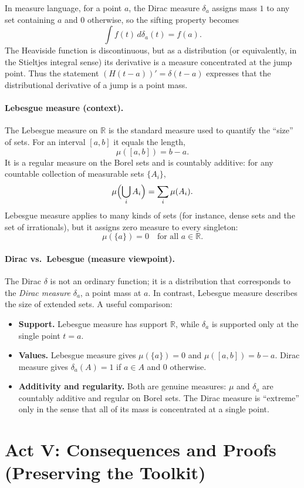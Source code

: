 \documentclass[12pt]{article}
\begin{document}
In measure language,
for a point $a$, the Dirac measure $\delta_a$ assigns mass $1$ to any set containing
$a$ and $0$ otherwise, so the sifting property becomes
\[
 \int f(t)\,d\delta_a(t)=f(a).
\]
The Heaviside function is discontinuous, but as a distribution (or equivalently, in the
Stieltjes integral sense) its derivative is a measure concentrated at the jump point.
Thus the statement $(H(t-a))'=\delta(t-a)$ expresses that the distributional derivative
of a jump is a point mass.

\paragraph{Lebesgue measure (context).}
The Lebesgue measure on $\mathbb{R}$ is the standard measure used to quantify the
``size'' of sets. For an interval $[a,b]$ it equals the length,
\[
 \mu([a,b])=b-a.
\]
It is a regular measure on the Borel sets and is countably additive: for any countable
collection of measurable sets $\{A_i\}$,
\[
 \mu\Bigl(\bigcup_i A_i\Bigr)=\sum_i \mu(A_i).
\]
Lebesgue measure applies to many kinds of sets (for instance, dense sets and the set of
irrationals), but it assigns zero measure to every singleton:
\[
 \mu(\{a\})=0 \quad \text{for all } a\in\mathbb{R}.
\]

\paragraph{Dirac vs.\ Lebesgue (measure viewpoint).}
The Dirac $\delta$ is not an ordinary function; it is a distribution that corresponds
to the \emph{Dirac measure} $\delta_a$, a point mass at $a$. In contrast, Lebesgue
measure describes the size of extended sets. A useful comparison:
\begin{itemize}
  \item \textbf{Support.} Lebesgue measure has support $\mathbb{R}$, while $\delta_a$
  is supported only at the single point $t=a$.
  \item \textbf{Values.} Lebesgue measure gives $\mu(\{a\})=0$ and
  $\mu([a,b])=b-a$. Dirac measure gives $\delta_a(A)=1$ if $a\in A$ and $0$ otherwise.
  \item \textbf{Additivity and regularity.} Both are genuine measures: $\mu$ and
  $\delta_a$ are countably additive and regular on Borel sets. The Dirac measure is
  ``extreme'' only in the sense that all of its mass is concentrated at a single point.
\end{itemize}

\section{Act V: Consequences and Proofs (Preserving the Toolkit)}
\end{document}
